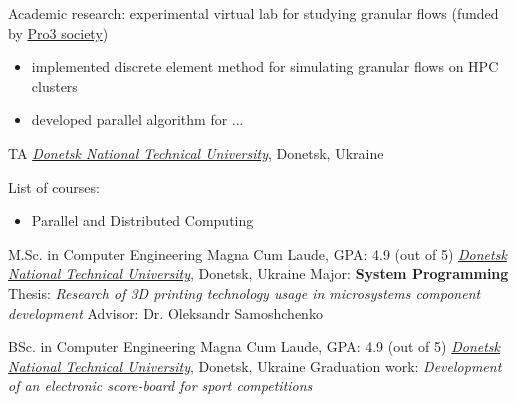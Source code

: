 \documentclass[
  a4paper
]{../FortySecondsCV/fortysecondscv}
\begin{document}
\begin{cvtable}[1]
         {
          Academic research: experimental virtual lab for studying granular flows
          (funded by \href{https://verfahrenstechnik-pro3.de/}{Pro3 society})
          {\footnotesize \setlength\parindent{0pt}\setlength{\parskip}{-1.em}
            \begin{itemize}[leftmargin=*]\setlength\itemsep{-.5em}
            \item 
              implemented discrete element method for simulating granular flows on HPC clusters
            \item developed parallel algorithm for ...
            \end{itemize}
          }
          {\scriptsize
          }
         }
\end{cvtable}


\begin{cvtable}[1]
         {TA}
         {\textit{\href{https://donntu.edu.ua/en/knt-en}{Donetsk National Technical University}}, Donetsk, Ukraine }
         {\setlength\parindent{0pt}\setlength{\parskip}{-1.5em}
           List of courses:%
           \begin{itemize}%
             \setlength\itemsep{-.5em}
           \item Parallel and Distributed Computing
           \end{itemize}
         }
\end{cvtable}

\begin{cvtable}[1.5]
         {M.Sc. in Computer Engineering}
         {Magna Cum Laude, GPA: 4.9 (out of 5)}
         {\href{http://cs.donntu.edu.ua/English/indexEn.php}{\it Donetsk National Technical University}, Donetsk, Ukraine 
           \newline Major: \textbf{System Programming}
           \newline Thesis: \textit{Research of 3D printing technology usage in microsystems component development}
           \newline Advisor: Dr. Oleksandr Samoshchenko
         }

                {BSc. in Computer Engineering}
                {Magna Cum Laude, GPA: 4.9 (out of 5)}
                {\href{http://cs.donntu.edu.ua/English/indexEn.php}{\it Donetsk National Technical University}, Donetsk, Ukraine 
                \newline Graduation work: \textit{Development of an electronic score-board for sport competitions}
              }
\end{cvtable}
\end{document}
